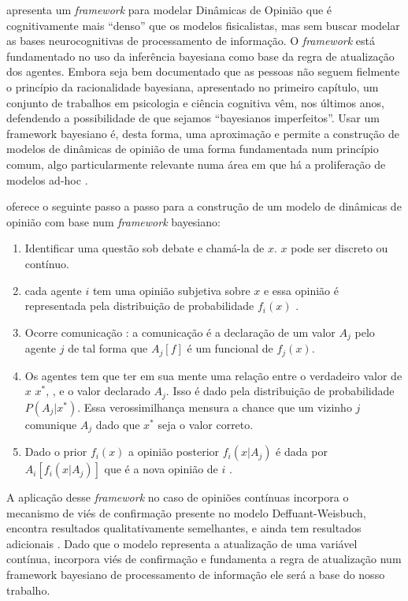  apresenta um \textit{framework} para modelar
Dinâmicas de Opinião que é cognitivamente mais
``denso'' que os modelos fisicalistas, mas sem buscar modelar as bases
neurocognitivas de processamento de informação. O \textit{framework} está
fundamentado no uso da inferência bayesiana como base da regra de atualização
dos agentes. Embora seja bem documentado que as pessoas não seguem fielmente o
princípio da racionalidade bayesiana, apresentado no primeiro capítulo, um
conjunto de trabalhos em psicologia e ciência cognitiva vêm, nos últimos anos,
defendendo a possibilidade de que sejamos ``bayesianos
imperfeitos''\cite{griffiths2006optimal,fujikawa2007perfect,baker2017rational,
  gintis2016individuality}. Usar um framework bayesiano é, desta forma, uma
aproximação e permite a construção de modelos de dinâmicas de opinião de uma
forma fundamentada num princípio comum, algo particularmente relevante numa área
em que há a proliferação de modelos ad-hoc \cite{flache2017,jager2017}.

  oferece o seguinte passo a passo
para a construção de um modelo de dinâmicas de opinião com base num
\textit{framework} bayesiano:

\begin{enumerate}
\item Identificar uma questão sob debate e chamá-la de $x$. \(x\) pode ser
  discreto ou contínuo.
\item cada agente \(i\) tem uma opinião subjetiva sobre $x$ e essa opinião é
  representada pela distribuição de probabilidade $f_i(x)$ .
\item Ocorre comunicação : a comunicação é a declaração de um valor
  $ A_j$ pelo agente $j$ de tal forma que $A_j[f]$ é um funcional de
  $f_j(x)$.
\item Os agentes tem que ter em sua mente  uma relação entre o
  verdadeiro valor de \(x\) \(x^*\), ,  e o valor declarado $A_j$. Isso é dado
  pela distribuição de probabilidade $P(A_j|x^*)$. Essa verossimilhança  mensura
  a chance que um vizinho \(j\) comunique \(A_j\) dado que \(x^*\) seja o valor correto.
\item Dado o prior $f_i(x)$ a opinião posterior $f_i(x|A_j)$ é dada
  por $A_i[f_i(x|A_j)]$ que é a nova opinião de $i$ .
\end{enumerate}





A aplicação desse \textit{framework} no caso de opiniões contínuas incorpora o
mecanismo de viés de confirmação presente no modelo Deffuant-Weisbuch, encontra
resultados qualitativamente semelhantes, e ainda tem resultados adicionais
\cite{martins2009bayesian}. Dado que o modelo representa a atualização de uma
variável contínua, incorpora viés de confirmação e fundamenta a regra de
atualização num framework bayesiano de processamento de informação ele será a
base do nosso trabalho.

